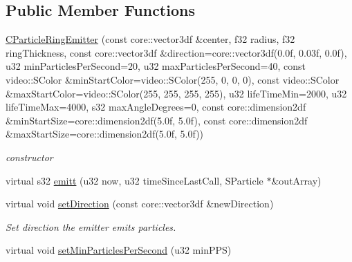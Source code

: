 \subsection*{Public Member Functions}
\begin{DoxyCompactItemize}
\item 
\hypertarget{classirr_1_1scene_1_1_c_particle_ring_emitter_a0a82bad1615573dfa4a53c0f2af12cbe}{\hyperlink{classirr_1_1scene_1_1_c_particle_ring_emitter_a0a82bad1615573dfa4a53c0f2af12cbe}{C\-Particle\-Ring\-Emitter} (const core\-::vector3df \&center, f32 radius, f32 ring\-Thickness, const core\-::vector3df \&direction=core\-::vector3df(0.\-0f, 0.\-03f, 0.\-0f), u32 min\-Particles\-Per\-Second=20, u32 max\-Particles\-Per\-Second=40, const video\-::\-S\-Color \&min\-Start\-Color=video\-::\-S\-Color(255, 0, 0, 0), const video\-::\-S\-Color \&max\-Start\-Color=video\-::\-S\-Color(255, 255, 255, 255), u32 life\-Time\-Min=2000, u32 life\-Time\-Max=4000, s32 max\-Angle\-Degrees=0, const core\-::dimension2df \&min\-Start\-Size=core\-::dimension2df(5.\-0f, 5.\-0f), const core\-::dimension2df \&max\-Start\-Size=core\-::dimension2df(5.\-0f, 5.\-0f))}\label{classirr_1_1scene_1_1_c_particle_ring_emitter_a0a82bad1615573dfa4a53c0f2af12cbe}

\begin{DoxyCompactList}\small\item\em constructor \end{DoxyCompactList}\item 
virtual s32 \hyperlink{classirr_1_1scene_1_1_c_particle_ring_emitter_a3403fd9ab835d2f17b0f81877cb7df70}{emitt} (u32 now, u32 time\-Since\-Last\-Call, S\-Particle $\ast$\&out\-Array)
\item 
\hypertarget{classirr_1_1scene_1_1_c_particle_ring_emitter_a5536e11e247cee8c5cd1eaad0b56613a}{virtual void \hyperlink{classirr_1_1scene_1_1_c_particle_ring_emitter_a5536e11e247cee8c5cd1eaad0b56613a}{set\-Direction} (const core\-::vector3df \&new\-Direction)}\label{classirr_1_1scene_1_1_c_particle_ring_emitter_a5536e11e247cee8c5cd1eaad0b56613a}

\begin{DoxyCompactList}\small\item\em Set direction the emitter emits particles. \end{DoxyCompactList}\item 
\hypertarget{classirr_1_1scene_1_1_c_particle_ring_emitter_a3c04fa150299bfebb25b0ea2c02da535}{virtual void \hyperlink{classirr_1_1scene_1_1_c_particle_ring_emitter_a3c04fa150299bfebb25b0ea2c02da535}{set\-Min\-Particles\-Per\-Second} (u32 min\-P\-P\-S)}\label{classirr_1_1scene_1_1_c_particle_ring_emitter_a3c04fa150299bfebb25b0ea2c02da535}


\end{DoxyCompactItemize}
